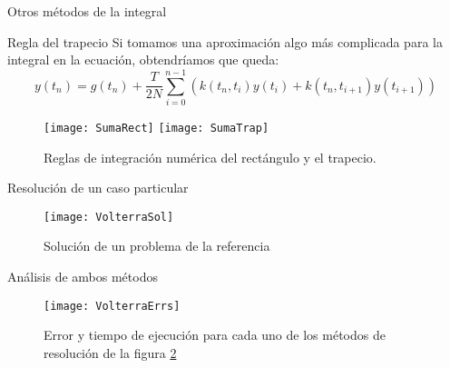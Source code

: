 \documentclass{beamer}
\begin{document}
\begin{frame}{Otros métodos de la integral}
    \begin{block}{Regla del trapecio}
        Si tomamos una aproximación algo más complicada para la integral en la ecuación, obtendríamos que queda:
        \begin{equation}
            y(t_n) = g(t_n) + \frac{T}{2N}\sum_{i=0}^{n-1} \left(k(t_n, t_i)y(t_i) + k(t_n, t_{i+1})y(t_{i+1})\right)
        \end{equation}
    \end{block}
    \begin{figure}[h!]
        \centering
        \texttt{[image: SumaRect]}
        \texttt{[image: SumaTrap]}
        \caption{Reglas de integración numérica del rectángulo y el trapecio.}
        \label{fig:reglasTrapSum}
    \end{figure}
\end{frame}

\begin{frame}{Resolución de un caso particular \cite{WolframAlphaVolt}}
    \begin{figure}
        \centering
        \texttt{[image: VolterraSol]}
        \caption{Solución de un problema de la referencia \cite{navarro2011ecuaciones}}
        \label{fig:SolucionVolt}
    \end{figure}
\end{frame}
\begin{frame}{Análisis de ambos métodos}
    \begin{figure}
        \centering
        \texttt{[image: VolterraErrs]}
        \caption{Error y tiempo de ejecución para cada uno de los métodos de resolución de la figura \ref{fig:SolucionVolt}}
        \label{fig:volterraAnal}
    \end{figure}
\end{frame}
\end{document}
